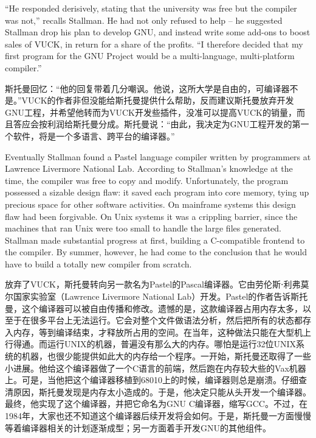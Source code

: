 \ifdefined\eng
``He responded derisively, stating that the university was free but the compiler was not,'' recalls Stallman. \ifdefined\vtwo He had not only refused to help -- he suggested Stallman drop his plan to develop GNU, and instead write some add-ons to boost sales of VUCK, in return for a share of the profits. \fi ``I therefore decided that my first program for the GNU Project would be a multi-language, multi-platform compiler.''\ifdefined\vone{}\fi\ifdefined\vtwo{}\fi
\fi

\ifdefined\chs
斯托曼回忆：``他的回复带着几分嘲讽。他说，这所大学是自由的，可编译器不是。\ifdefined\vtwo ''VUCK的作者非但没能给斯托曼提供什么帮助，反而建议斯托曼放弃开发GNU工程，并希望他转而为VUCK开发些插件，没准可以提高VUCK的销量，而且答应会按利润给斯托曼分成。斯托曼说：``\fi 由此，我决定为GNU工程开发的第一个软件，将是一个多语言、跨平台的编译器\ifdefined\vone{}\fi\ifdefined\vtwo{}\fi 。''
\fi

\ifdefined\vone
\ifdefined\eng
Eventually Stallman found a Pastel language compiler written by programmers at Lawrence Livermore National Lab. According to Stallman's knowledge at the time, the compiler was free to copy and modify. Unfortunately, the program possessed a sizable design flaw: it saved each program into core memory, tying up precious space for other software activities. On mainframe systems this design flaw had been forgivable. On Unix systems it was a crippling barrier, since the machines that ran Unix were too small to handle the large files generated. Stallman made substantial progress at first, building a C-compatible frontend to the compiler. By summer, however, he had come to the conclusion that he would have to build a totally new compiler from scratch.
\fi

\ifdefined\chs
放弃了VUCK，斯托曼转向另一款名为Pastel的Pascal编译器。它由劳伦斯⋅利弗莫尔国家实验室（Lawrence Livermore National Lab）开发。Pastel的作者告诉斯托曼，这个编译器可以被自由传播和修改。遗憾的是，这款编译器占用内存太多，以至于在很多平台上无法运行。它会对整个文件做语法分析，然后把所有的状态都存入内存，等到编译结束，才释放所占用的空间。在当年，这种做法只能在大型机上行得通。而运行UNIX的机器，普遍没有那么大的内存。哪怕是运行32位UNIX系统的机器，也很少能提供如此大的内存给一个程序。一开始，斯托曼还取得了一些小进展。他给这个编译器做了一个C语言的前端，然后跑在内存较大些的Vax机器上。可是，当他把这个编译器移植到68010上的时候，编译器则总是崩溃。仔细查清原因，斯托曼发现是内存太小造成的。于是，他决定只能从头开发一个编译器。最终，他实现了这个编译器，并把它命名为GNU C编译器，缩写GCC。不过，在1984年，大家也还不知道这个编译器后续开发将会如何。于是，斯托曼一方面慢慢等着编译器相关的计划逐渐成型；另一方面着手开发GNU的其他组件。
\fi
\fi

